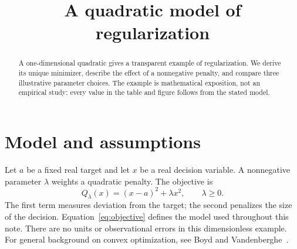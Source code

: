 \def\lakitlanguageprofile{english}
\def\lakitmainlanguage{english}
\def\lakitdocumentclass{article}
\def\lakitclassoptions{11pt,a4paper}
\def\lakitgeometryoptions{margin=2.7cm,headheight=14pt}
\def\lakitlinespread{1.08}
\def\lakitsecnumdepth{2}
\def\lakitparagraphstyle{indented}



\title{A quadratic model of regularization}
\author{}
\date{}
\theoremstyle{definition}
\newtheorem{paperlemma}{Lemma}
\pagestyle{plain}

\maketitle
\begin{abstract}
A one-dimensional quadratic gives a transparent example of regularization.
We derive its unique minimizer, describe the effect of a nonnegative penalty,
and compare three illustrative parameter choices. The example is mathematical
exposition, not an empirical study: every value in the table and figure follows
from the stated model.
\end{abstract}
\section{Model and assumptions}
Let $a$ be a fixed real target and let $x$ be a real decision variable. A
nonnegative parameter $\lambda$ weights a quadratic penalty. The objective is
\begin{equation}\label{eq:objective}
Q_\lambda(x)=(x-a)^2+\lambda x^2,\qquad \lambda\geq 0.
\end{equation}
The first term measures deviation from the target; the second penalizes the
size of the decision. Equation~\eqref{eq:objective} defines the model used
throughout this note. There are no units or observational errors in this
dimensionless example. For general background on convex optimization, see
Boyd and Vandenberghe~\cite{boyd2004}.
